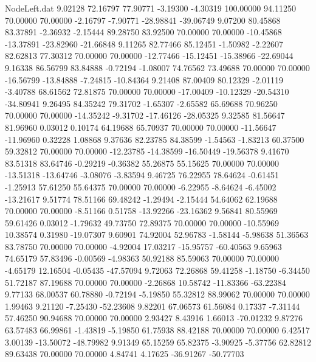 \begin{filecontents}{NodeLeft.dat}
   9.02128   72.16797   77.90771    -3.19300   -4.30319  100.00000   94.11250   70.00000   70.00000   -2.16797   -7.90771  -28.98841  -39.06749
   9.07200   80.45868   83.37891    -2.36932   -2.15444   89.28750   83.92500   70.00000   70.00000  -10.45868  -13.37891  -23.82960  -21.66848
   9.11265   82.77466   85.12451    -1.50982   -2.22607   82.62813   77.30312   70.00000   70.00000  -12.77466  -15.12451  -15.38966  -22.69044
   9.16338   86.56799   83.84888    -0.72194   -1.08007   74.76562   73.49688   70.00000   70.00000  -16.56799  -13.84888   -7.24815  -10.84364
   9.21408   87.00409   80.12329    -2.01119   -3.40788   68.61562   72.81875   70.00000   70.00000  -17.00409  -10.12329  -20.54310  -34.80941
   9.26495   84.35242   79.31702    -1.65307   -2.65582   65.69688   70.96250   70.00000   70.00000  -14.35242   -9.31702  -17.46126  -28.05325
   9.32585   81.56647   81.96960     0.03012    0.10174   64.19688   65.70937   70.00000   70.00000  -11.56647  -11.96960    0.32228    1.08868
   9.37636   82.23785   84.38599    -1.54563   -1.83213   60.37500   59.32812   70.00000   70.00000  -12.23785  -14.38599  -16.50449  -19.56378
   9.41670   83.51318   83.64746    -0.29219   -0.36382   55.26875   55.15625   70.00000   70.00000  -13.51318  -13.64746   -3.08076   -3.83594
   9.46725   76.22955   78.64624    -0.61451   -1.25913   57.61250   55.64375   70.00000   70.00000   -6.22955   -8.64624   -6.45002  -13.21617
   9.51774   78.51166   69.48242    -1.29494   -2.15444   54.64062   62.19688   70.00000   70.00000   -8.51166    0.51758  -13.92266  -23.16362
   9.56841   80.55969   59.61426     0.03012   -1.79632   49.73750   72.89375   70.00000   70.00000  -10.55969   10.38574    0.31980  -19.07307
   9.60901   74.92004   52.96783    -1.58144   -5.98638   51.36563   83.78750   70.00000   70.00000   -4.92004   17.03217  -15.95757  -60.40563
   9.65963   74.65179   57.83496    -0.00569   -4.98363   50.92188   85.59063   70.00000   70.00000   -4.65179   12.16504   -0.05435  -47.57094
   9.72063   72.26868   59.41258    -1.18750   -6.34450   51.72187   87.19688   70.00000   70.00000   -2.26868   10.58742  -11.83366  -63.22384
   9.77133   68.00537   60.78880    -0.72194   -5.19850   55.32812   88.99062   70.00000   70.00000    1.99463    9.21120   -7.25430  -52.23608
   9.82201   67.06573   61.56084     0.17337   -7.31144   57.46250   90.94688   70.00000   70.00000    2.93427    8.43916    1.66013  -70.01232
   9.87276   63.57483   66.99861    -1.43819   -5.19850   61.75938   88.42188   70.00000   70.00000    6.42517    3.00139  -13.50072  -48.79982
   9.91349   65.15259   65.82375    -3.90925   -5.37756   62.82812   89.63438   70.00000   70.00000    4.84741    4.17625  -36.91267  -50.77703

\end{filecontents}

